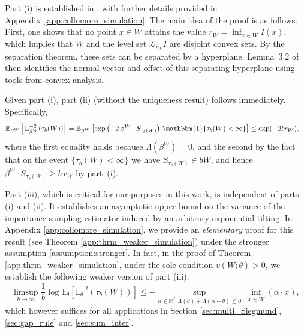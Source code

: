 \documentclass[aap,preprint]{imsart}
\newcommand{\Exp}{{\mathbb{E}}}
\newcommand{\bR}{{\mathbb{R}}}
\theoremstyle{plain}
\theoremstyle{definition}
\begin{document}



Part (i) is established in \cite{collamore2002}, with further details provided in Appendix~\ref{app:collomore_simulation}. The main idea of the proof is as follows. First, one shows that no point $x \in W$ attains the value $r_W = \inf_{x \in W} I(x)$, which implies that $W$ and the level set $\mathcal{L}_{r_W} I$ are disjoint convex sets. By the separation theorem, these sets can be separated by a hyperplane. Lemma~3.2 of \cite{collamore1996} then identifies the normal vector and offset of this separating hyperplane using tools from convex analysis.

Given part (i), part (ii) (without the uniqueness result) follows immediately. Specifically,  
\begin{align*}
\mathbb{E}_{\beta^{W}}\left[ 
\mathbb{L}_{\beta^{W}}^{-2}(\tau_b(W))
\right] 
&= \mathbb{E}_{\beta^{W}}\left[ 
\exp\left(-2\,\beta^{W} \cdot S_{\tau_b(W)}\right) \, \mathbbm{1}\{\tau_b(W) < \infty\}
\right] 
\leq \exp(-2 b r_W),
\end{align*}
where  the first equality holds because $\Lambda(\beta^W) =  0$, and  the  second by the fact that on the event $\{\tau_b(W) < \infty\}$ we have $S_{\tau_b(W)} \in bW$, and hence $\beta^{W} \cdot S_{\tau_b(W)} \geq b \, r_W$ by part~(i).  %

Part (iii), which is critical for our purposes in this work, is independent of parts (i) and (ii). It establishes an asymptotic upper bound on the variance of the importance sampling estimator induced by an arbitrary exponential tilting. 
In Appendix \ref{app:collomore_simulation}, 
we provide an \textit{elementary} proof for this result (see Theorem \ref{app:thrm_weaker_simulation}) under the stronger assumption \eqref{assumption:stronger}.
In fact,  in the proof of Theorem \ref{app:thrm_weaker_simulation}, under the sole condition  $v(W;\theta) > 0$,   we establish the following weaker version of part (iii):
$$
    \limsup_{b \to \infty} \frac{1}{b} \log \Exp_{\theta}\left[ 
\mathbb{L}_{\theta}^{-2}(\tau_b(W))
\right] \leq   -    \sup_{\alpha \in \bR^d:  \Lambda(\theta) + \Lambda(\alpha - \theta) \leq 0} \; \inf_{x \in \overline{W}} (\alpha \cdot x),
$$
which however suffices  for all  applications in Section \ref{sec:multi_Siegmund}, \ref{sec:gap_rule} and \ref{sec:sum_inter}.
\end{document}
